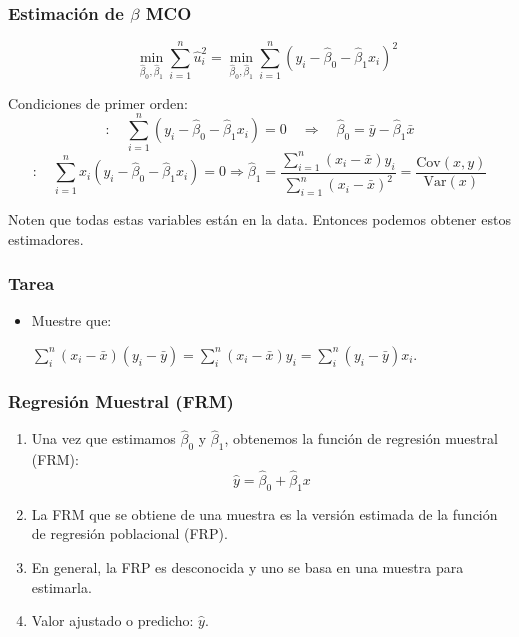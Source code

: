\documentclass{beamer}
\begin{document}
\begin{frame}
	\frametitle{Estimaci\'on de $\beta$ MCO} %
\begin{equation*}
\quad \min_{\hat{\beta}_0, \hat{\beta}_1} \sum_{i=1}^{n} \hat{u}_i^2 = \min_{\hat{\beta}_0, \hat{\beta}_1} \sum_{i=1}^{n} (y_i - \hat{\beta}_0 - \hat{\beta}_1 x_i)^2
\end{equation*}

Condiciones de primer orden:
{\small
\begin{equation*}
[\hat{\beta}_0] : \quad \sum_{i=1}^{n} (y_i - \hat{\beta}_0 - \hat{\beta}_1 x_i) = 0 \quad \Rightarrow \quad \hat{\beta}_0 = \bar{y} - \hat{\beta}_1 \bar{x} 
\end{equation*}
\begin{equation*}
[\hat{\beta}_1] : \quad \sum_{i=1}^{n} x_i(y_i - \hat{\beta}_0 - \hat{\beta}_1 x_i) = 0 \Rightarrow \hat{\beta}_1 = \frac{\sum_{i=1}^{n}(x_i - \bar{x})y_i}{\sum_{i=1}^{n}(x_i - \bar{x})^2} = \frac{\text{Cov}(x, y)}{\text{Var}(x)} 
\end{equation*}}

Noten que todas estas variables están en la data. Entonces podemos obtener estos estimadores.

\end{frame}

\begin{frame}
	\frametitle{Tarea } %
 	\begin{itemize}
  \item Muestre que:
  
  $\sum_{i}^n(x_i - \bar{x})(y_i - \bar{y}) = \sum_{i}^n(x_i - \bar{x})y_i= \sum_{i}^n(y_i - \bar{y})x_i$.
 	\end{itemize}
\end{frame}

\begin{frame}
	\frametitle{Regresión Muestral (FRM)} %
	\begin{enumerate}
		\item Una vez que estimamos $\hat{\beta}_0$ y $\hat{\beta}_1$, obtenemos la función de regresión muestral (FRM):
		\[ \hat{y} = \hat{\beta}_0 + \hat{\beta}_1 x \]
		
		\item La FRM que se obtiene de una muestra es la versión estimada de la función de regresión poblacional (FRP).
		
		\item En general, la FRP es desconocida y uno se basa en una muestra para estimarla.
		
		\item {\color{blue} Valor ajustado o predicho: $\hat{y}$.}
	\end{enumerate}
\end{frame}	
\end{document}
